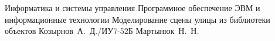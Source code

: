 \documentclass{bmstu}
\begin{document}
\makecourseworktitle
{Информатика и системы управления}
{Программное обеспечение ЭВМ и информационные технологии}
{Моделирование сцены улицы из библиотеки объектов}
{Козырнов~А.~Д./ИУ7-52Б}
{Мартынюк~Н.~Н.}
{}


\maketableofcontents


%
%








\makebibliography




\end{document}
